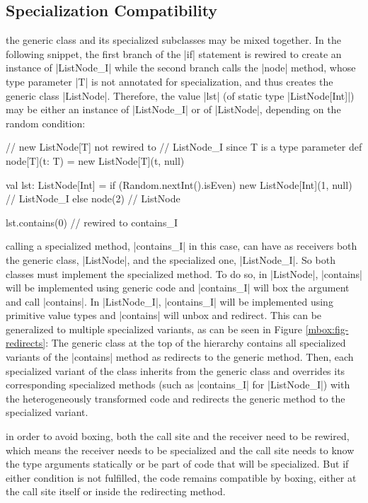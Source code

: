 \subsection{Specialization Compatibility}
\label{mbox:subsec-spec-compatibility}

 the generic class and its specialized subclasses may be mixed together. In the following snippet, the first branch of the |if| statement is rewired to create an instance of |ListNode_I| while the second branch calls the |node| method, whose type parameter |T| is not annotated for specialization, and thus creates the generic class |ListNode|. Therefore, the value |lst| (of static type |ListNode[Int]|) may be either an instance of |ListNode_I| or of |ListNode|, depending on the random condition:

\begin{lstlisting-nobreak}
 // new ListNode[T] not rewired to
 // ListNode_I since T is a type parameter
 def node[T](t: T) = new ListNode[T](t, null)

 val lst: ListNode[Int] =
   if (Random.nextInt().isEven)
     new ListNode[Int](1, null) // ListNode_I
   else
     node(2)                             // ListNode

 lst.contains(0) // rewired to contains_I
\end{lstlisting-nobreak}

 calling a specialized method, |contains_I| in this case, can have as receivers both the generic class, |ListNode|, and the specialized one, |ListNode_I|. So both classes must implement the specialized method. To do so, in |ListNode|, |contains| will be implemented using generic code and |contains_I| will box the argument and call |contains|. In |ListNode_I|, |contains_I| will be implemented using primitive value types and |contains| will unbox and redirect. This can be generalized to multiple specialized variants, as can be seen in Figure \ref{mbox:fig-redirects}: The generic class at the top of the hierarchy contains all specialized variants of the |contains| method as redirects to the generic method. Then, each specialized variant of the class inherits from the generic class and overrides its corresponding specialized methods (such as |contains_I| for |ListNode_I|) with the heterogeneously transformed code and redirects the generic method to the specialized variant.

 in order to avoid boxing, both the call site and the receiver need to be rewired, which means the receiver needs to be specialized and the call site needs to know the type arguments statically or be part of code that will be specialized. But if either condition is not fulfilled, the code remains compatible by boxing, either at the call site itself or inside the redirecting method.

